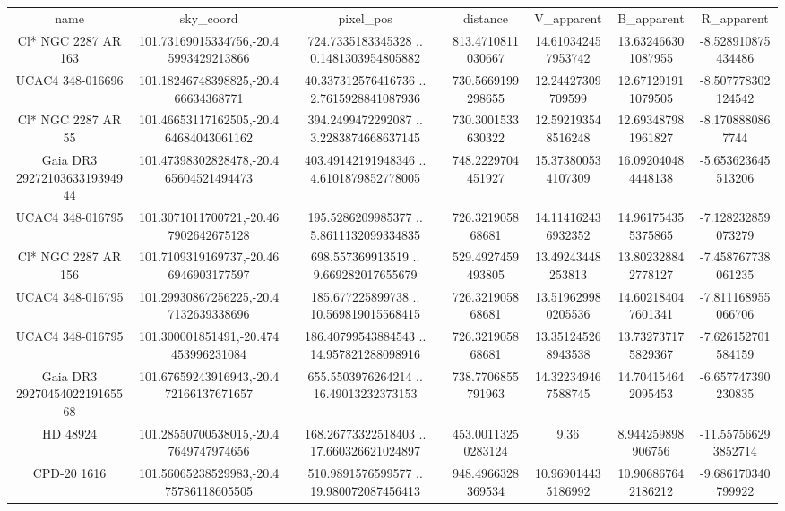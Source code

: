 \begin{table}
\begin{tabular}{ccccccc}
name & sky_coord & pixel_pos & distance & V_apparent & B_apparent & R_apparent \\
Cl* NGC 2287     AR     163 & 101.73169015334756,-20.45993429213866 & 724.7335183345328 .. 0.1481303954805882 & 813.4710811030667 & 14.610342457953742 & 13.632466301087955 & -8.528910875434486 \\
UCAC4 348-016696 & 101.18246748398825,-20.466634368771 & 40.337312576416736 .. 2.7615928841087936 & 730.5669199298655 & 12.24427309709599 & 12.671291911079505 & -8.507778302124542 \\
Cl* NGC 2287     AR      55 & 101.46653117162505,-20.464684043061162 & 394.2499472292087 .. 3.2283874668637145 & 730.3001533630322 & 12.592193548516248 & 12.693487981961827 & -8.1708880867744 \\
Gaia DR3 2927210363319394944 & 101.47398302828478,-20.465604521494473 & 403.49142191948346 .. 4.6101879852778005 & 748.2229704451927 & 15.373800534107309 & 16.092040484448138 & -5.653623645513206 \\
UCAC4 348-016795 & 101.3071011700721,-20.467902642675128 & 195.5286209985377 .. 5.8611132099334835 & 726.321905868681 & 14.114162436932352 & 14.961754355375865 & -7.128232859073279 \\
Cl* NGC 2287     AR     156 & 101.7109319169737,-20.466946903177597 & 698.557369913519 .. 9.669282017655679 & 529.4927459493805 & 13.49243448253813 & 13.802328842778127 & -7.458767738061235 \\
UCAC4 348-016795 & 101.29930867256225,-20.47132639338696 & 185.677225899738 .. 10.569819015568415 & 726.321905868681 & 13.519629980205536 & 14.602184047601341 & -7.811168955066706 \\
UCAC4 348-016795 & 101.300001851491,-20.474453996231084 & 186.40799543884543 .. 14.957821288098916 & 726.321905868681 & 13.351245268943538 & 13.732737175829367 & -7.626152701584159 \\
Gaia DR3 2927045402219165568 & 101.67659243916943,-20.472166137671657 & 655.5503976264214 .. 16.49013232373153 & 738.7706855791963 & 14.322349467588745 & 14.704154642095453 & -6.657747390230835 \\
HD  48924 & 101.28550700538015,-20.47649747974656 & 168.26773322518403 .. 17.660326621024897 & 453.00113250283124 & 9.36 & 8.944259898906756 & -11.557566293852714 \\
CPD-20  1616 & 101.56065238529983,-20.475786118605505 & 510.9891576599577 .. 19.980072087456413 & 948.4966328369534 & 10.969014435186992 & 10.906867642186212 & -9.686170340799922 \\

\end{tabular}
\end{table}
